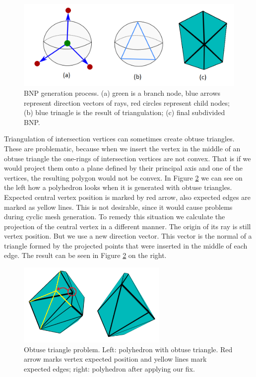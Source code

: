 \begin{figure}[h]
    \centering
    \includegraphics[width=\textwidth]{images/bnp_gen_ilu.png}
    \caption[BNP generation process]{BNP generation process. (a) green is a branch node, blue arrows represent direction vectors of rays, red circles represent child nodes; (b) blue trinagle is the result of triangulation; (c) final subdivided BNP.}
    \label{fig:bnp_gen_ilu}
\end{figure}

Triangulation of intersection vertices can sometimes create obtuse triangles. These are problematic, because when we insert the vertex in the middle of an obtuse triangle the one-rings of intersection vertices are not convex. That is if we would project them onto a plane defined by their principal axis and one of the vertices, the resulting polygon would not be convex. In Figure \ref{fig:obtus_tri_ilu} we can see on the left how a polyhedron looks when it is generated with obtuse triangles. Expected central vertex position is marked by red arrow, also expected edges are marked as yellow lines. This is not desirable, since it would cause problems during cyclic mesh generation. To remedy this situation we calculate the projection of the central vertex in a different manner. The origin of its ray is still vertex position. But we use a new direction vector. This vector is the normal of a triangle formed by the projected points that were inserted in the middle of each edge. The result can be seen in Figure \ref{fig:obtus_tri_ilu} on the right.

\begin{figure}[h]
    \centering
    \includegraphics[height=4cm]{images/obtuse_triangle_fix_ilu.png}
    \caption[Obtuse triangle problem]{Obtuse triangle problem. Left: polyhedron with obtuse triangle. Red arrow marks vertex expected position and yellow lines mark expected edges; right: polyhedron after applying our fix.}
    \label{fig:obtus_tri_ilu}
\end{figure}

